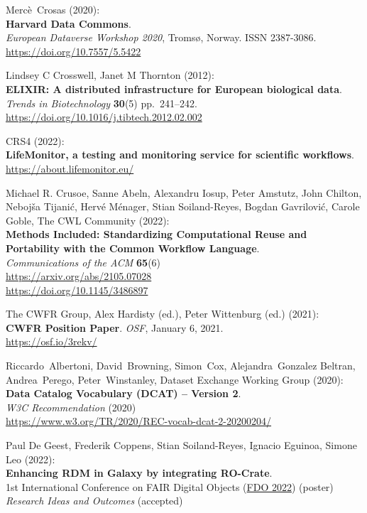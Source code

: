 \begin{thebibliography}{9}
Mercè~Crosas (2020):\\
\textbf{Harvard Data Commons}.\\
\emph{European Dataverse Workshop 2020}, Tromsø, Norway. ISSN
2387-3086.\\
\url{https://doi.org/10.7557/5.5422}

Lindsey C Crosswell, Janet M Thornton (2012):\\
\textbf{ELIXIR: A distributed infrastructure for European biological
data}.\\
\emph{Trends in Biotechnology} \textbf{30}(5) pp.~241--242.\\
\url{https://doi.org/10.1016/j.tibtech.2012.02.002}

CRS4 (2022):\\
\textbf{LifeMonitor, a testing and monitoring service for scientific
workflows}.\\
\url{https://about.lifemonitor.eu/}

Michael R. Crusoe, Sanne Abeln, Alexandru Iosup, Peter
Amstutz, John Chilton, Nebojša Tijanić, Hervé Ménager, Stian
Soiland-Reyes, Bogdan Gavrilović, Carole Goble, The CWL Community
(2022):\\
\textbf{Methods Included: Standardizing
Computational Reuse and Portability with the Common Workflow
Language}.\\
\emph{Communications of the ACM} \textbf{65}(6)\\
\url{https://arxiv.org/abs/2105.07028}\\
\url{https://doi.org/10.1145/3486897}

The CWFR Group, Alex Hardisty (ed.), Peter Wittenburg (ed.)
(2021):\\
\textbf{CWFR Position Paper}. \emph{OSF}, January 6, 2021.\\
\url{https://osf.io/3rekv/}

Riccardo~Albertoni, David~Browning, Simon~Cox,
Alejandra~Gonzalez Beltran, Andrea~Perego, Peter~Winstanley, Dataset
Exchange Working Group (2020):\\
\textbf{Data Catalog Vocabulary (DCAT) -- Version 2}.\\
\emph{W3C Recommendation} (2020)\\
\url{https://www.w3.org/TR/2020/REC-vocab-dcat-2-20200204/}


Paul De Geest, Frederik Coppens, Stian
Soiland-Reyes, Ignacio Eguinoa, Simone Leo (2022):\\
\textbf{Enhancing RDM in Galaxy by integrating RO-Crate}.\\
1st International Conference on FAIR Digital Objects
(\href{https://www.fdo2022.org/}{FDO 2022}) (poster)\\
\emph{Research Ideas and Outcomes} (accepted)


\end{thebibliography}
